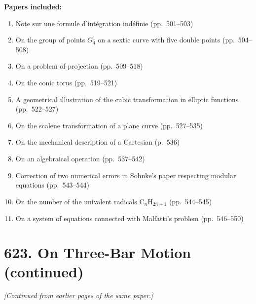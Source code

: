 \documentclass[11pt,a4paper]{book}
\begin{document}
\noindent\textbf{Papers included:}
\begin{enumerate}
\item[\textbf{[612]}] Note sur une formule d'int\'{e}gration ind\'{e}finie (pp.~501--503)
\item[\textbf{[613]}] On the group of points $G_4^1$ on a sextic curve with five double points (pp.~504--508)
\item[\textbf{[614]}] On a problem of projection (pp.~509--518)
\item[\textbf{[615]}] On the conic torus (pp.~519--521)
\item[\textbf{[616]}] A geometrical illustration of the cubic transformation in elliptic functions (pp.~522--527)
\item[\textbf{[617]}] On the scalene transformation of a plane curve (pp.~527--535)
\item[\textbf{[618]}] On the mechanical description of a Cartesian (p.~536)
\item[\textbf{[619]}] On an algebraical operation (pp.~537--542)
\item[\textbf{[620]}] Correction of two numerical errors in Sohnke's paper respecting modular equations (pp.~543--544)
\item[\textbf{[621]}] On the number of the univalent radicals C$_n$H$_{2n+1}$ (pp.~544--545)
\item[\textbf{[622]}] On a system of equations connected with Malfatti's problem (pp.~546--550)
\end{enumerate}
\clearpage


\thispagestyle{empty}


\newpage

\section*{\textbf{623.} On Three-Bar Motion (continued)}

\textit{[Continued from earlier pages of the same paper.]}

\bigskip
\end{document}
